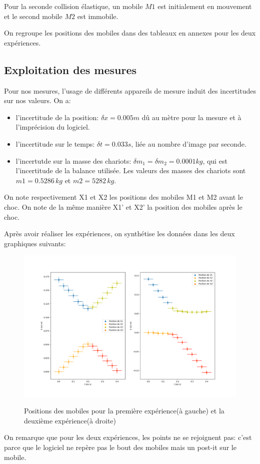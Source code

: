 \documentclass[12pt]{article}
\begin{document}
Pour la seconde collision élastique, un mobile $M1$ est initialement en mouvement et le second mobile $M2$ est immobile.

On regroupe les positions des mobiles dans des tableaux en annexes pour les deux expériences.

\subsection{Exploitation des mesures}
Pour nos mesures, l'usage de différents appareils de mesure induit des incertitudes sur nos valeurs. On a:
\begin{itemize}
    \item l'incertitude de la position: $\delta x = 0.005m$ dû au mètre pour la mesure et à l'imprécision du logiciel.
    \item l'incertitude sur le temps: $\delta t = 0.033s$, liée au nombre d'image par seconde. 
    \item l'incertutde sur la masse des chariots: $\delta m_1 =\delta m_2 = 0.0001 kg$, qui est l'incertitude de la balance utilisée. Les valeurs des masses des chariots sont $m1=0.5286\,kg$ et $m2=5282\, kg$.
\end{itemize}

On note respectivement X1 et X2 les positions des mobiles M1 et M2 avant le choc. On note de la même manière X1' et X2' la position des mobiles après le choc. 

\newpage
Après avoir réaliser les expériences, on synthétise les données dans les deux graphiques suivants:
\begin{figure}[h!]
	\begin{center}
		\includegraphics[scale=0.5]{GrapheX.png}
		\label{GrapheX1,...}
		 \caption{Positions des mobiles pour la première expérience(à gauche) et la deuxième expérience(à droite)}
	\end{center}
\end{figure}
On remarque que pour les deux expériences, les points ne se rejoignent pas: c'est parce que le logiciel ne repère pas le bout des mobiles mais un post-it sur le mobile.  
\end{document}

